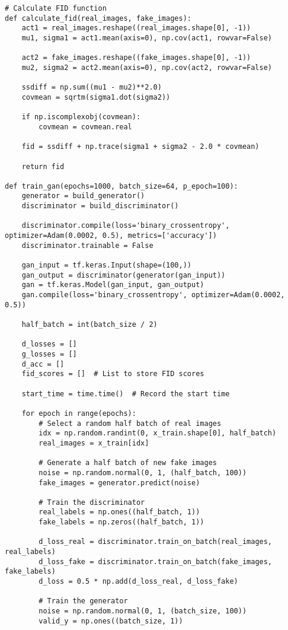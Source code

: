 \begin{lstlisting}[style=mypython, caption=GAN model with dense layers]
# Calculate FID function
def calculate_fid(real_images, fake_images):
    act1 = real_images.reshape((real_images.shape[0], -1))
    mu1, sigma1 = act1.mean(axis=0), np.cov(act1, rowvar=False)
    
    act2 = fake_images.reshape((fake_images.shape[0], -1))
    mu2, sigma2 = act2.mean(axis=0), np.cov(act2, rowvar=False)
    
    ssdiff = np.sum((mu1 - mu2)**2.0)
    covmean = sqrtm(sigma1.dot(sigma2))
    
    if np.iscomplexobj(covmean):
        covmean = covmean.real
    
    fid = ssdiff + np.trace(sigma1 + sigma2 - 2.0 * covmean)
    
    return fid

def train_gan(epochs=1000, batch_size=64, p_epoch=100):
    generator = build_generator()
    discriminator = build_discriminator()

    discriminator.compile(loss='binary_crossentropy', optimizer=Adam(0.0002, 0.5), metrics=['accuracy'])
    discriminator.trainable = False

    gan_input = tf.keras.Input(shape=(100,))
    gan_output = discriminator(generator(gan_input))
    gan = tf.keras.Model(gan_input, gan_output)
    gan.compile(loss='binary_crossentropy', optimizer=Adam(0.0002, 0.5))

    half_batch = int(batch_size / 2)
    
    d_losses = []
    g_losses = []
    d_acc = []
    fid_scores = []  # List to store FID scores
    
    start_time = time.time()  # Record the start time

    for epoch in range(epochs):
        # Select a random half batch of real images
        idx = np.random.randint(0, x_train.shape[0], half_batch)
        real_images = x_train[idx]

        # Generate a half batch of new fake images
        noise = np.random.normal(0, 1, (half_batch, 100))
        fake_images = generator.predict(noise)

        # Train the discriminator
        real_labels = np.ones((half_batch, 1))
        fake_labels = np.zeros((half_batch, 1))

        d_loss_real = discriminator.train_on_batch(real_images, real_labels)
        d_loss_fake = discriminator.train_on_batch(fake_images, fake_labels)
        d_loss = 0.5 * np.add(d_loss_real, d_loss_fake)

        # Train the generator
        noise = np.random.normal(0, 1, (batch_size, 100))
        valid_y = np.ones((batch_size, 1))


\end{lstlisting}
